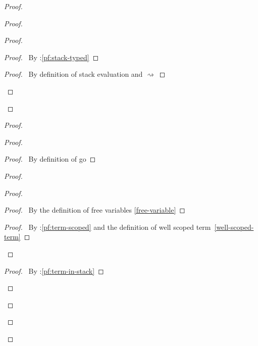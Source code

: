\documentclass[a4paper]{article}
\begin{document}
\begin{proof}
\begin{proof}
\begin{proof}
      \begin{proof}
        \pf\ By \toplevel:\ref{pf:stack-typed}
      \end{proof}
      \begin{proof}
        \pf\ By definition of stack evaluation and $\rightsquigarrow$
      \end{proof}
    \end{proof}
  \end{proof}
  \begin{proof}
    \begin{proof}
      \begin{proof}
        \pf\ By definition of \textsf{go}
      \end{proof}
      \begin{proof}
        \begin{proof}
          \begin{proof}
            \pf\ By the definition of free variables \ref{free-variable}
          \end{proof}
          \qedstep
          \begin{proof}
            \pf\ By \toplevel:\ref{pf:term-scoped} and the definition of well scoped term~\ref{well-scoped-term}
          \end{proof}
        \end{proof}
        \begin{proof}
          \pf\ By \toplevel:\ref{pf:term-in-stack}

\end{proof}
\end{proof}
\end{proof}
\end{proof}
\end{proof}
\end{document}
